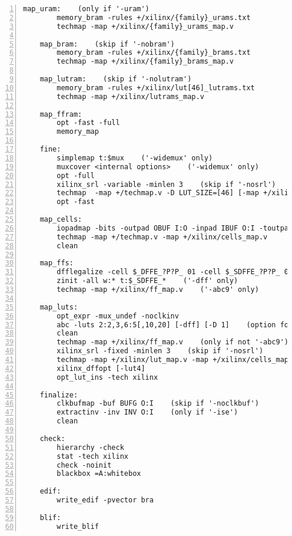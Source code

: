 \begin{lstlisting}[numbers=left,frame=single]
    map_uram:    (only if '-uram')
        memory_bram -rules +/xilinx/{family}_urams.txt
        techmap -map +/xilinx/{family}_urams_map.v

    map_bram:    (skip if '-nobram')
        memory_bram -rules +/xilinx/{family}_brams.txt
        techmap -map +/xilinx/{family}_brams_map.v

    map_lutram:    (skip if '-nolutram')
        memory_bram -rules +/xilinx/lut[46]_lutrams.txt
        techmap -map +/xilinx/lutrams_map.v

    map_ffram:
        opt -fast -full
        memory_map

    fine:
        simplemap t:$mux    ('-widemux' only)
        muxcover <internal options>    ('-widemux' only)
        opt -full
        xilinx_srl -variable -minlen 3    (skip if '-nosrl')
        techmap  -map +/techmap.v -D LUT_SIZE=[46] [-map +/xilinx/mux_map.v] -map +/xilinx/arith_map.v
        opt -fast

    map_cells:
        iopadmap -bits -outpad OBUF I:O -inpad IBUF O:I -toutpad OBUFT ~T:I:O -tinoutpad IOBUF ~T:O:I:IO A:top    (skip if '-noiopad')
        techmap -map +/techmap.v -map +/xilinx/cells_map.v
        clean

    map_ffs:
        dfflegalize -cell $_DFFE_?P?P_ 01 -cell $_SDFFE_?P?P_ 01 -cell $_DLATCH_?P?_ 01    (for xc6v, xc7, xcu, xcup)
        zinit -all w:* t:$_SDFFE_*    ('-dff' only)
        techmap -map +/xilinx/ff_map.v    ('-abc9' only)

    map_luts:
        opt_expr -mux_undef -noclkinv
        abc -luts 2:2,3,6:5[,10,20] [-dff] [-D 1]    (option for '-nowidelut', '-dff', '-retime')
        clean
        techmap -map +/xilinx/ff_map.v    (only if not '-abc9')
        xilinx_srl -fixed -minlen 3    (skip if '-nosrl')
        techmap -map +/xilinx/lut_map.v -map +/xilinx/cells_map.v -D LUT_WIDTH=[46]
        xilinx_dffopt [-lut4]
        opt_lut_ins -tech xilinx

    finalize:
        clkbufmap -buf BUFG O:I    (skip if '-noclkbuf')
        extractinv -inv INV O:I    (only if '-ise')
        clean

    check:
        hierarchy -check
        stat -tech xilinx
        check -noinit
        blackbox =A:whitebox

    edif:
        write_edif -pvector bra 

    blif:
        write_blif 
\end{lstlisting}

